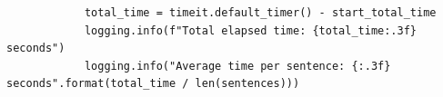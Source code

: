 \begin{listing}
\begin{verbatim}
            total_time = timeit.default_timer() - start_total_time
            logging.info(f"Total elapsed time: {total_time:.3f} seconds")
            logging.info("Average time per sentence: {:.3f} seconds".format(total_time / len(sentences)))
    \end{verbatim}
    \caption[\texttt{main.py} (deel 1)]{Het eerste deel van \texttt{main.py} definieert de functies die nodig zijn voor het uitvoeren van . Het script laadt modellen en verwerkt zinnen met behulp van de \texttt{pipeline} functionaliteit van \gls{huggingface}. De belangrijkste functies zijn \texttt{run\_inference}, die voorspellingen doet voor gemaskeerde woorden, en \texttt{main}, die de zinnen ophaalt, modellen laadt, en de totale verwerkingstijd registreert.}
    \label{lst:main-part1}
\end{listing}

